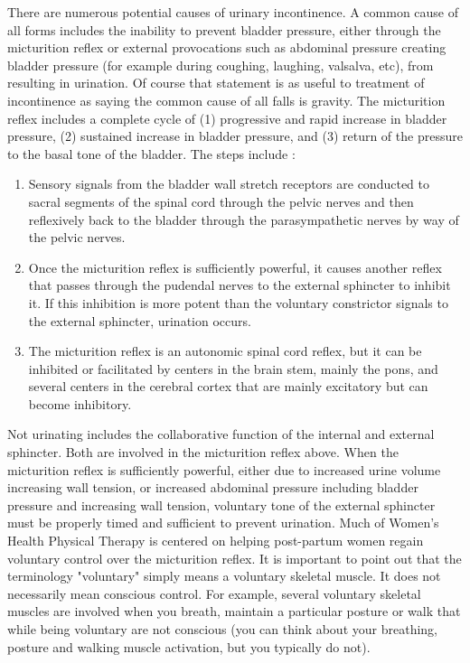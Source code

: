 There are numerous potential causes of urinary incontinence. A common cause of all forms includes the inability to prevent bladder pressure, either through the micturition reflex or external provocations such as abdominal pressure creating bladder pressure (for example during coughing, laughing, valsalva, etc), from resulting in urination. Of course that statement is as useful to treatment of incontinence as saying the common cause of all falls is gravity. The micturition reflex includes a complete cycle of (1) progressive and rapid increase in bladder pressure, (2) sustained increase in bladder pressure, and (3) return of the pressure to the basal tone of the bladder. 
\vspace{4mm}
The steps include \cite{hall_guyton_2020}:

\begin{enumerate}
    \item Sensory signals from the bladder wall stretch receptors are conducted to sacral segments of the spinal cord through the pelvic nerves and then reflexively back to the bladder through the parasympathetic nerves by way of the pelvic nerves.
    \item  Once the micturition reflex is sufficiently powerful, it causes another reflex that passes through the pudendal nerves to the external sphincter to inhibit it. If this inhibition is more potent than the voluntary constrictor signals to the external sphincter, urination occurs.
    \item  The micturition reflex is an autonomic spinal cord reflex, but it can be inhibited or facilitated by centers in the brain stem, mainly the pons, and several centers in the cerebral cortex that are mainly excitatory but can become inhibitory.
\end{enumerate}

Not urinating includes the collaborative function of the internal and external sphincter. Both are involved in the micturition reflex above. When the micturition reflex is sufficiently powerful, either due to increased urine volume increasing wall tension, or increased abdominal pressure including bladder pressure and increasing wall tension, voluntary tone of the external sphincter must be properly timed and sufficient to prevent urination. Much of Women's Health Physical Therapy is centered on helping post-partum women regain voluntary control over the micturition reflex. It is important to point out that the terminology "voluntary" simply means a voluntary skeletal muscle. It does not necessarily mean conscious control. For example, several voluntary skeletal muscles are involved when you breath, maintain a particular posture or walk that while being voluntary are not conscious (you can think about your breathing, posture and walking muscle activation, but you typically do not).


